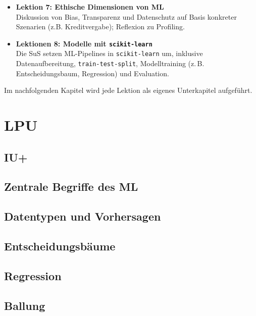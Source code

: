 \documentclass[twocolumn]{article}
\begin{document}
\begin{itemize}[itemsep=0.3em, parsep=0pt, topsep=0em]
  \item \textbf{Lektion 7: Ethische Dimensionen von ML}\\
  Diskussion von Bias, Transparenz und Datenschutz auf Basis konkreter Szenarien (z.B. Kreditvergabe); Reflexion zu Profiling.

  \item \textbf{Lektionen 8: Modelle mit \texttt{scikit-learn}}\\
  Die SuS setzen ML-Pipelines in \texttt{scikit-learn} um, inklusive Datenaufbereitung, \texttt{train-test-split}, Modelltraining (z. B. Entscheidungsbaum, Regression) und Evaluation.

\end{itemize}

Im nachfolgenden Kapitel wird jede Lektion als eigenes Unterkapitel aufgeführt.

\newpage
\onecolumn
\section{LPU}
\setcounter{subsection}{-1}
\subsection{IU+}
\label{sec:iuplus}


\subsection{Zentrale Begriffe des ML}
\label{sec:first}


\subsection{Datentypen und Vorhersagen}


\subsection{Entscheidungsbäume}


\subsection{Regression}


\subsection{Ballung}
\label{sec:clustering}

\end{document}
